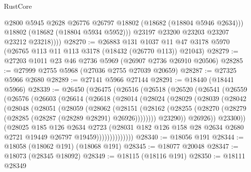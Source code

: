 \begin{lexlean}{RustCore}
\begin{coremodule}
                @2800
                @5945
                @2628
                @26776
                @26797
                @18802
                (@18682 (@18804 @5946 @2634)))
              @18802
              (@18682 (@18804 @5934 @5952)))
            @23197
            @23200
            @23203
            @23207
            @23212
            @23218))))
@28270 := @26883
    @131
    @1037
    @11
    @47
    @3178
    @5970
    (@26765 @113 @11 @113 @3178 (@18432 (@26770 @113)) @21043)
@28279 := @27203 @1011 @23 @46 @2736 @5969 (@26907 @2736 @26910 @20506)
@28285 := @27999 @2755 @5968 (@27036 @2755 @27039 @20659)
@28287 := @27325 @5966 @2680
@28289 := @27141 @5966 @27144
@28291 := @18440 (@18441 @5966)
@28339 := @26450
    (@26475
      (@26516
        (@26518
          (@26520
            (@26541
              (@26559
                (@26576
                  (@26603
                    (@26614
                      (@26618
                        (@28014
                          (@28024
                            (@28029
                              (@28039
                                (@28042
                                  (@28048
                                    (@28051
                                      (@28059
                                        (@28062
                                          (@28151
                                            (@28162
                                              (@28255
                                                (@28270
                                                  (@28279
                                                    (@28285 (@28287 (@28289 @28291) @26926))))))))
                                        @23290))
                                    @26926))
                                @23300))
                            (@28025
                              @185
                              @126
                              @2634
                              @2723
                              (@28031
                                @182
                                @126
                                @158
                                @28
                                @2634
                                @2680
                                @2721
                                @19449
                                @26797
                                @19459))))))))))))))
@28340 := @18056 @191
@28344 := @18058 (@18062 @191) (@18068 @191)
@28345 := @18077 @20048
@28347 := @18073 (@28345 @18092)
@28349 := @18115 (@18116 @191)
@28350 := @18111 @28349

\end{coremodule}
\end{lexlean}
